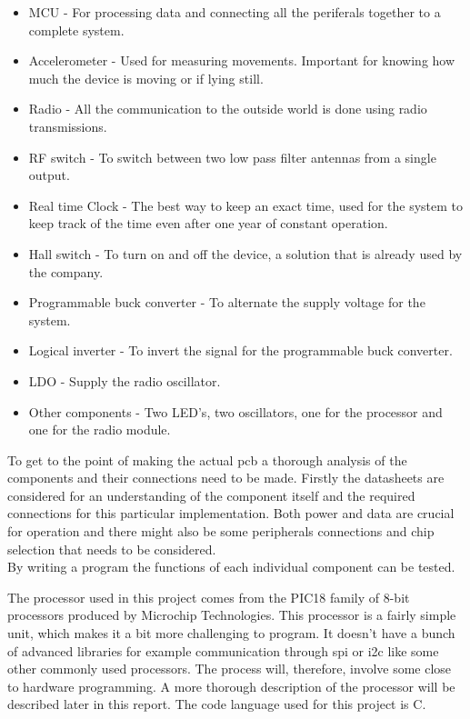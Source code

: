 \begin{itemize}[noitemsep]
	\item MCU - For processing data and connecting all the periferals together to a complete system.
	\item Accelerometer - Used for measuring movements. Important for knowing how much the device is moving or if lying still.
	\item Radio - All the communication to the outside world is done using radio transmissions. 
	\item RF switch - To switch between two low pass filter antennas from a single output.
	\item Real time Clock - The best way to keep an exact time, used for the system to keep track of the time even after one year of constant operation. 
	\item Hall switch - To turn on and off the device, a solution that is already used by the company.
	\item Programmable buck converter - To alternate the supply voltage for the system. 
	\item Logical inverter - To invert the signal for the programmable buck converter.
	\item LDO - Supply the radio oscillator.
	\item Other components - Two LED's, two oscillators, one for the processor and one for the radio module.
\end{itemize}


To get to the point of making the actual \gls{pcb} a thorough analysis of the components and their connections need to be made. Firstly the datasheets are considered for an understanding of the component itself and the required connections for this particular implementation. Both power and data are crucial for operation and there might also be some peripherals connections and chip selection that needs to be considered. \\
By writing a program the functions of each individual component can be tested. 

The processor used in this project comes from the PIC18 family of 8-bit processors produced by Microchip Technologies. This processor is a fairly simple unit, which makes it a bit more challenging to program. It doesn't have a bunch of advanced libraries for example communication through \gls{spi} or \gls{i2c} like some other commonly used processors. The process will, therefore, involve some close to hardware programming. A more thorough description of the processor will be described later in this report. The code language used for this project is C.

\begin{comment}
In some cases the component needs to be initialized in a specific way or it needs some other special attention which might require additional connections than it firstly seemed.
With all the specified components connected together a program is made to show all the functions and that they work as intended. 
To ensure that each component on the \gls{pcb} works and the prototype can be handed over to the software developers for a more advanced and optimized program. 
\end{comment}

